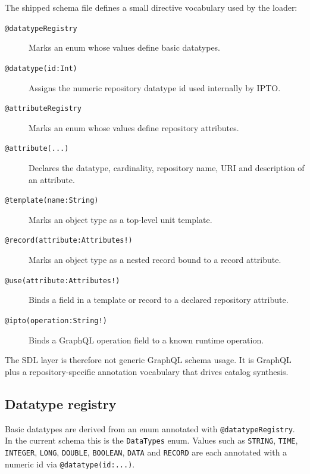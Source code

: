 The shipped schema file  defines a small directive vocabulary used by the loader:
\begin{description}
\item[\texttt{@datatypeRegistry}] Marks an enum whose values define basic datatypes.
\vspace{.2cm}
\item[\texttt{@datatype(id:Int)}] Assigns the numeric repository datatype id used internally by IPTO.
\vspace{.2cm}
\item[\texttt{@attributeRegistry}] Marks an enum whose values define repository attributes.
\vspace{.2cm}
\item[\texttt{@attribute(...)}] Declares the datatype, cardinality, repository name, URI and description of an attribute.
\vspace{.2cm}
\item[\texttt{@template(name:String)}] Marks an object type as a top-level unit template.
\vspace{.2cm}
\item[\texttt{@record(attribute:Attributes!)}] Marks an object type as a nested record bound to a record attribute.
\vspace{.2cm}
\item[\texttt{@use(attribute:Attributes!)}] Binds a field in a template or record to a declared repository attribute.
\vspace{.2cm}
\item[\texttt{@ipto(operation:String!)}] Binds a GraphQL operation field to a known runtime operation.
\end{description}

The SDL layer is therefore not generic GraphQL schema usage. It is GraphQL plus a repository-specific annotation vocabulary that drives catalog synthesis.

\subsection{Datatype registry}

Basic datatypes are derived from an enum annotated with \texttt{@datatypeRegistry}. In the current schema this is the \texttt{DataTypes} enum. Values such as \texttt{STRING}, \texttt{TIME}, \texttt{INTEGER}, \texttt{LONG}, \texttt{DOUBLE}, \texttt{BOOLEAN}, \texttt{DATA} and \texttt{RECORD} are each annotated with a numeric id via \texttt{@datatype(id:...)}.

